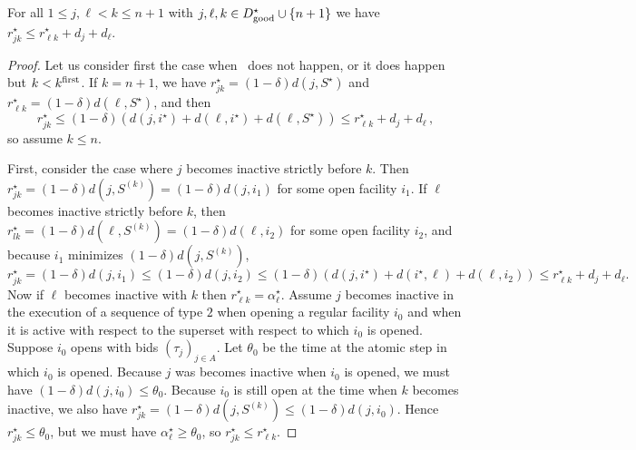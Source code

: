 \begin{lemma}
\label{lem:fr-r-metric-robust}
    For all $1 \le j,\ell < k \le n + 1$ with $j, \ell, k \in D^\star_{\mathrm{good}} \cup \{n+1\}$ we have $r^\star_{jk} \le r^\star_{\ell k} + d_j + d_\ell$.
\end{lemma}
\begin{proof}
    Let us consider first the case when \specialevent\ does not happen, or it does happen but $k < k^{\mathrm{first}}$.
    If $k = n + 1$, we have $r^\star_{jk} = (1-\delta)d(j, S^\star)$ and $r^\star_{\ell k} = (1-\delta) d(\ell, S^\star)$, and then 
    \[r^\star_{jk} \leq (1-\delta)(d(j, i^\star) + d(\ell, i^\star) + d(\ell, S^\star)) \leq r^\star_{\ell k} + d_j + d_\ell\,,\]
    so assume $k \leq n$.
    
    First, consider the case where $j$ becomes inactive strictly before $k$. Then $r^\star_{jk} = (1-\delta)d(j,S^{(k)}) = (1-\delta)d(j,i_1)$ for some open facility $i_1$. If $\ell$ becomes inactive strictly before $k$, then $r^\star_{lk} = (1-\delta)d(\ell,S^{(k)}) = (1-\delta)d(\ell,i_2)$ for some open facility $i_2$, and because $i_1$ minimizes $(1-\delta)d(j,S^{(k)})$, 
    \[
        r^\star_{jk} = (1-\delta)d(j,i_1) \le (1-\delta)d(j,i_2) \le (1-\delta)(d(j,i^\star) + d(i^\star,\ell) + d(\ell,i_2)) \le r^\star_{\ell k} + d_j + d_\ell.
    \]
    Now if $\ell$ becomes inactive with $k$ then $r^\star_{\ell k} = \alpha^\star_\ell$. 
    Assume $j$ becomes inactive in the execution of a sequence of type $2$ when opening a regular facility $i_0$ and when it is active with respect to the superset with respect to which $i_0$ is opened.
    Suppose $i_0$ opens with bids $(\tau_j)_{j \in A}$.
    Let $\theta_0$ be the time at the atomic step in which $i_0$ is opened.
    Because $j$ was becomes inactive when $i_0$ is opened, we must have $(1-\delta) d(j, i_0) \leq \theta_0$.
    Because $i_0$ is still open at the time when $k$ becomes inactive, we also have $r^\star_{jk} = (1-\delta)d(j, S^{(k)}) \leq (1-\delta)d(j,i_0)$.
    Hence $r^\star_{jk} \leq \theta_0$, but we must have $\alpha^\star_\ell \geq \theta_0$, so $r^\star_{jk} \leq r^\star_{\ell k}$.
     

\end{proof}
